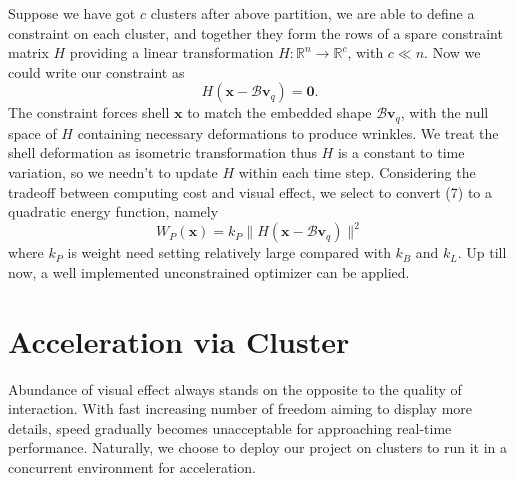 \documentclass[a4paper,9pt,twocolumn]{extarticle}
\begin{document}
Suppose we have got $c$ clusters after above partition, we are able to define a constraint on each cluster, and together they form the rows of a spare constraint matrix $H$ providing a linear transformation $H:\mathbb{R}^n\rightarrow \mathbb{R}^c$, with $c\ll n$. Now we could write our constraint as
\begin{equation}
  H(\textbf{x}-\mathcal{B}\textbf{v}_q)=\textbf{0}.
\end{equation}
The constraint forces shell $\textbf{x}$ to match the embedded shape $\mathcal{B}\textbf{v}_q$, with the null space of $H$ containing necessary deformations to produce wrinkles. We treat the shell deformation as isometric transformation thus $H$ is a constant to time variation, so we needn't to update $H$ within each time step. Considering the tradeoff between computing cost and visual effect, we select to convert (7) to a quadratic energy function, namely
\begin{equation}
  W_P(\textbf{x})=k_P\|H(\textbf{x}-\textbf{$\mathcal{B}$}\textbf{v}_q)\|^2
\end{equation}
where $k_P$ is weight need setting relatively large compared with $k_B$ and $k_L$. Up till now, a well implemented unconstrained optimizer can be applied.


\section{Acceleration via Cluster}
Abundance of visual effect always stands on the opposite to the quality of interaction. With fast increasing number of freedom aiming to display more details, speed gradually becomes unacceptable for approaching real-time performance. Naturally, we choose to deploy our project on clusters to run it in a concurrent environment for acceleration.
\end{document}

